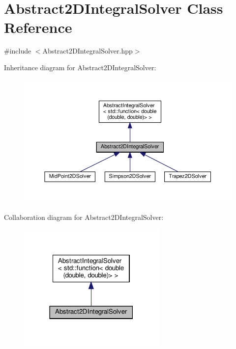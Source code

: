 \hypertarget{class_abstract2_d_integral_solver}{}\section{Abstract2\+D\+Integral\+Solver Class Reference}
\label{class_abstract2_d_integral_solver}


{\ttfamily \#include $<$Abstract2\+D\+Integral\+Solver.\+hpp$>$}



Inheritance diagram for Abstract2\+D\+Integral\+Solver\+:
\nopagebreak
\begin{figure}[H]
\begin{center}
\leavevmode
\includegraphics[width=350pt]{class_abstract2_d_integral_solver__inherit__graph}
\end{center}
\end{figure}


Collaboration diagram for Abstract2\+D\+Integral\+Solver\+:
\nopagebreak
\begin{figure}[H]
\begin{center}
\leavevmode
\includegraphics[width=206pt]{class_abstract2_d_integral_solver__coll__graph}
\end{center}
\end{figure}
